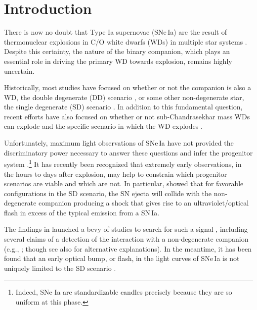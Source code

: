\documentclass[twocolumn]{aastex63}
\begin{document}
\keywords{}

\section{Introduction}

There is now no doubt that Type Ia supernovae (SNe\,Ia) are the result of
thermonuclear explosions in C/O white dwarfs (WDs) in multiple star systems
\citep[see e.g.,][and references therein]{Maoz14}. Despite this certainty, the
nature of the binary companion, which plays an essential role in driving the
primary WD towards explosion, remains highly uncertain.

Historically, most studies have focused on whether or not the companion is
also a WD, the double degenerate (DD) scenario \citep[e.g.,][]{Webbink84}, or
some other non-degenerate star, the single degenerate (SD) scenario
\citep[e.g.,][]{Whelan73}. In addition to this fundamental question, recent
efforts have also focused on whether or not sub-Chandrasekhar mass WDs can
explode \citep[e.g.,][]{Fink10,Shen14,Scalzo14a,Polin19} and the specific
scenario in which the WD explodes \citep[see][and references
therein]{Hillebrandt13,Ropke18}.

Unfortunately, maximum light observations of SNe\,Ia have not provided the
discriminatory power necessary to answer these questions and infer the
progenitor system \citep[e.g.,][]{Ropke12}.\footnote{Indeed, SNe Ia are
standardizable candles precisely because they are so uniform at this phase.}
It has recently been recognized that extremely early observations, in the
hours to days after explosion, may help to constrain which progenitor
scenarios are viable and which are not. In particular, \citet{Kasen10a} showed
that for favorable configurations in the SD scenario, the SN ejecta will
collide with the non-degenerate companion producing a shock that gives rise to
an ultraviolet/optical flash in excess of the typical emission from a SN\,Ia.

The findings in \citet{Kasen10a} launched a bevy of studies to search for such
a signal \citep[e.g.,][]{Hayden10,Ganeshalingam11,Bianco11,Nugent11,Olling15},
including several claims of a detection of the interaction with a
non-degenerate companion (e.g.,
\citealt{Cao15,Marion16,Hosseinzadeh17,Dimitriadis19}; though see also
\citealt{Kromer16,Shappee18,Shappee19,Jiang18} for alternative explanations).
In the meantime, it has been found that an early optical bump, or flash, in
the light curves of SNe\,Ia is not uniquely limited to the SD scenario
\citep[e.g.,][]{Raskin13,Piro16,Levanon17,Noebauer17,Jiang17,Maeda18,Polin19,
De19,Magee20a}.
\end{document}
